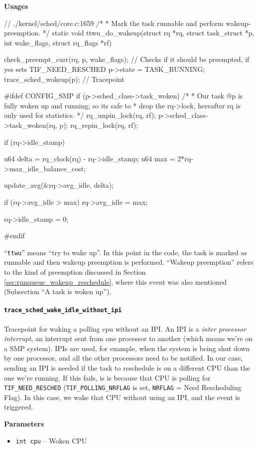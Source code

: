 \textbf{Usages}
\begin{code}
// ./kernel/sched/core.c:1659
/*
 * Mark the task runnable and perform wakeup-preemption.
 */
static void ttwu_do_wakeup(struct rq *rq, struct task_struct *p, int wake_flags, struct rq_flags *rf){
	check_preempt_curr(rq, p, wake_flags); // Checks if it should be preempted, if yes sets TIF_NEED_RESCHED
	p->state = TASK_RUNNING;
	trace_sched_wakeup(p); // Tracepoint

#ifdef CONFIG_SMP
	if (p->sched_class->task_woken) {
		/*
		 * Our task @p is fully woken up and running; so its safe to
		 * drop the rq->lock, hereafter rq is only used for statistics.
		 */
		rq_unpin_lock(rq, rf);
		p->sched_class->task_woken(rq, p);
		rq_repin_lock(rq, rf);
	}

	if (rq->idle_stamp) {
		u64 delta = rq_clock(rq) - rq->idle_stamp;
		u64 max = 2*rq->max_idle_balance_cost;

		update_avg(&rq->avg_idle, delta);

		if (rq->avg_idle > max)
			rq->avg_idle = max;

		rq->idle_stamp = 0;
	}
#endif
}
\end{code}
``\verb|ttwu|'' means ``try to wake up''. In this point in the code, the task is marked as runnable and then wakeup preemption is performed. ``Wakeup preemption'' refers to the kind of preemption discussed in Section \ref{sec:runqueue_wakeup_reschedule}, where this event was also mentioned (Subsection ``A task is woken up'').
  
\paragraph{\texttt{trace\_sched\_wake\_idle\_without\_ipi}}
Tracepoint for waking a polling cpu without an IPI. An IPI is a \textit{inter processor interrupt}, an interrupt sent from one processor to another (which means we're on  a SMP system). IPIs are used, for example, when the system is being shut down by one processor, and all the other processors need to be notified. In our case, sending an IPI is needed if the task to reschedule is on a different CPU than the one we're running. If this fails, is is because that CPU is polling for \verb|TIF_NEED_RESCHED| (\verb|TIF_POLLING_NRFLAG| is set, \verb|NRFLAG| = Need Rescheduling Flag). In this case, we wake that CPU without using an IPI, and the event is triggered.

\textbf{Parameters}
\begin{itemize}
    \item \verb|int cpu| -- Woken CPU
\end{itemize}

